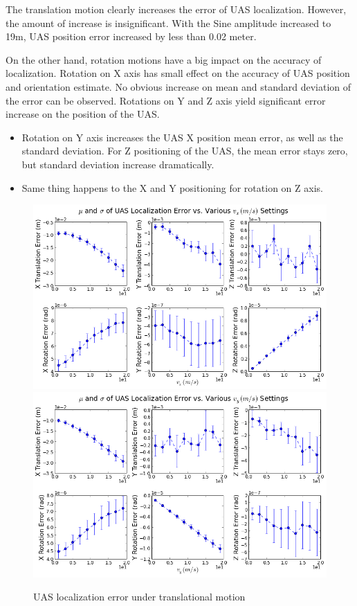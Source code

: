 The translation motion clearly increases the error of UAS localization. 
However, the amount of increase is insignificant. With the Sine 
amplitude increased to 19m, UAS position error increased by less than 
0.02 meter. 

On the other hand, rotation motions have a big impact on the accuracy of 
localization. Rotation on X axis has small effect on the accuracy of UAS 
position and orientation estimate. No obvious increase on mean and 
standard deviation of the error can be observed. Rotations on Y and Z 
axis yield significant error increase on the position of the UAS. 

\begin{itemize}
  \item Rotation on Y axis increases the UAS X position mean error, as
  well as the standard deviation. For Z positioning of the UAS, the
  mean error stays zero, but standard deviation increase dramatically.
  \item Same thing happens to the X and Y positioning for rotation on
  Z axis.
\end{itemize}

\begin{figure}[h]
  \centering
  \includegraphics[scale=0.25]{./Figures/SimulationFigures/Figure9.png}
  \includegraphics[scale=0.25]{./Figures/SimulationFigures/Figure10.png}
  \caption{UAS localization error under translational \label{fig:simfig9-10}
    motion}
  
\end{figure}

